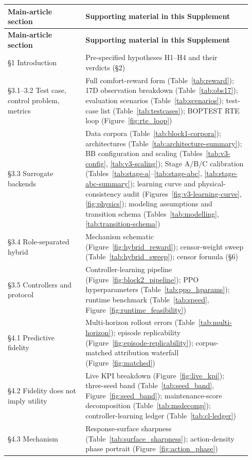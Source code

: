 \documentclass[11pt,a4paper]{article}
\begin{document}
\begin{longtable}{@{}p{0.30\linewidth}p{0.64\linewidth}@{}}
\toprule
\textbf{Main-article section} & \textbf{Supporting material in this Supplement} \\
\midrule
\endfirsthead
\textbf{Main-article section} & \textbf{Supporting material in this Supplement} \\
\midrule
\endhead
\S1 Introduction & Pre-specified hypotheses H1--H4 and their verdicts (\S2) \\
\S3.1--3.2 Test case, control problem, metrics & Full comfort-reward form (Table~\ref{tab:reward}); 17D observation breakdown (Table~\ref{tab:obs17}); evaluation scenarios (Table~\ref{tab:scenarios}); test-case list (Table~\ref{tab:testcases}); BOPTEST RTE loop (Figure~\ref{fig:rte_loop}) \\
\S3.3 Surrogate backends & Data corpora (Table~\ref{tab:block1-corpora}); architectures (Table~\ref{tab:architecture-summary}); BB configuration and scaling (Tables~\ref{tab:v3-config}, \ref{tab:v3-scaling}); Stage A/B/C calibration (Tables~\ref{tab:stage-a}--\ref{tab:stage-abc}, \ref{tab:stage-abc-summary}); learning curve and physical-consistency audit (Figures~\ref{fig:v3-learning-curve}, \ref{fig:physics}); modeling assumptions and transition schema (Tables~\ref{tab:modelling}, \ref{tab:transition-schema}) \\
\S3.4 Role-separated hybrid & Mechanism schematic (Figure~\ref{fig:hybrid_reward}); censor-weight sweep (Table~\ref{tab:hybrid_sweep}); censor formula (\S6) \\
\S3.5 Controllers and protocol & Controller-learning pipeline (Figure~\ref{fig:block2_pipeline}); PPO hyperparameters (Table~\ref{tab:ppo_hparams}); runtime benchmark (Table~\ref{tab:speed}, Figure~\ref{fig:runtime_feasibility}) \\
\S4.1 Predictive fidelity & Multi-horizon rollout errors (Table~\ref{tab:multi-horizon}); episode replicability (Figure~\ref{fig:episode-replicability}); corpus-matched attribution waterfall (Figure~\ref{fig:matched}) \\
\S4.2 Fidelity does not imply utility & Live KPI breakdown (Figure~\ref{fig:live_kpi}); three-seed band (Table~\ref{tab:seed_band}, Figure~\ref{fig:seed_band}); maintenance-score decomposition (Table~\ref{tab:msdecomp}); controller-learning ledger (Table~\ref{tab:cl-ledger}) \\
\S4.3 Mechanism & Response-surface sharpness (Table~\ref{tab:surface_sharpness}); action-density phase portrait (Figure~\ref{fig:action_phase}) \\

\end{longtable}
\end{document}
